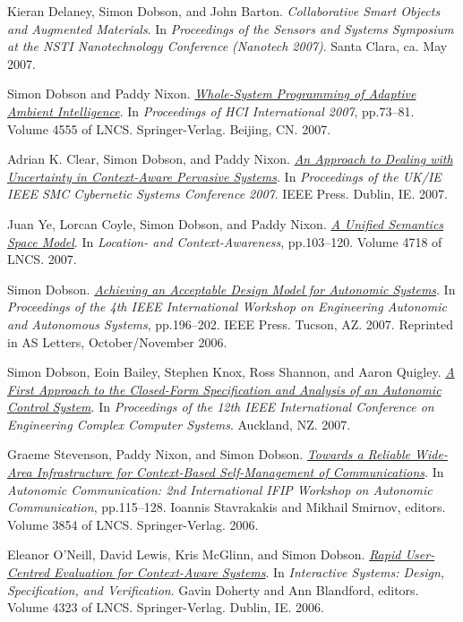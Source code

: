 \documentclass[11pt]{article}
\begin{document}
\label{orgdb8407e}Kieran Delaney, Simon Dobson, and John Barton.  \emph{Collaborative Smart Objects and Augmented Materials}. In \emph{Proceedings of the Sensors and Systems Symposium at the NSTI Nanotechnology Conference (Nanotech 2007)}. Santa Clara, ca. May 2007.

\label{org1a80660}Simon Dobson and Paddy Nixon.  \emph{\href{https://simondobson.org/softcopy/sesami-07.pdf}{Whole-System Programming of Adaptive Ambient Intelligence}}. In \emph{Proceedings of HCI International 2007}, pp.73–81. Volume 4555 of LNCS. Springer-Verlag. Beijing, CN. 2007.

\label{org96d457b}Adrian K. Clear, Simon Dobson, and Paddy Nixon.  \emph{\href{https://simondobson.org/softcopy/smc-07.pdf}{An Approach to Dealing with Uncertainty in Context-Aware Pervasive Systems}}. In \emph{Proceedings of the UK/IE IEEE SMC Cybernetic Systems Conference 2007}. IEEE Press. Dublin, IE. 2007.

\label{org4119f3d}Juan Ye, Lorcan Coyle, Simon Dobson, and Paddy Nixon.  \emph{\href{https://simondobson.org/softcopy/loca-07.pdf}{A Unified Semantics Space Model}}. In \emph{Location- and Context-Awareness}, pp.103–120. Volume 4718 of LNCS. 2007.

\label{orgba11bbe}Simon Dobson.  \emph{\href{https://simondobson.org/softcopy/composition-tfaas-06.pdf}{Achieving an Acceptable Design Model for Autonomic Systems}}. In \emph{Proceedings of the 4th IEEE International Workshop on Engineering Autonomic and Autonomous Systems}, pp.196–202. IEEE Press. Tucson, AZ. 2007. Reprinted in AS Letters, October/November 2006.

\label{orge98aaff}Simon Dobson, Eoin Bailey, Stephen Knox, Ross Shannon, and Aaron Quigley.  \emph{\href{https://simondobson.org/softcopy/iceccs2007.pdf}{A First Approach to the Closed-Form Specification and Analysis of an Autonomic Control System}}. In \emph{Proceedings of the 12th IEEE International Conference on Engineering Complex Computer Systems}. Auckland, NZ. 2007.

\label{org168b705}Graeme Stevenson, Paddy Nixon, and Simon Dobson.  \emph{\href{https://simondobson.org/softcopy/WAC-05.pdf}{Towards a Reliable Wide-Area Infrastructure for Context-Based Self-Management of Communications}}. In \emph{Autonomic Communication: 2nd International IFIP Workshop on Autonomic Communication}, pp.115–128. Ioannis Stavrakakis and Mikhail Smirnov, editors. Volume 3854 of LNCS. Springer-Verlag. 2006.

\label{orgb5d4cd0}Eleanor O’Neill, David Lewis, Kris McGlinn, and Simon Dobson.  \emph{\href{https://simondobson.org/softcopy/dsvis-06.pdf}{Rapid User-Centred Evaluation for Context-Aware Systems}}. In \emph{Interactive Systems: Design, Specification, and Verification}. Gavin Doherty and Ann Blandford, editors. Volume 4323 of LNCS. Springer-Verlag. Dublin, IE. 2006.
\end{document}
